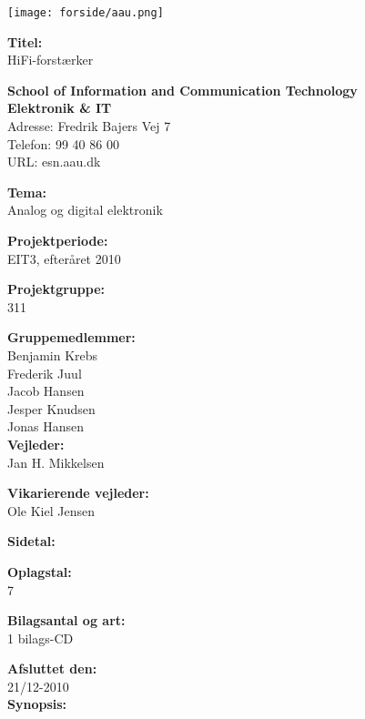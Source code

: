\begin{multicols}{2}
\texttt{[image: forside/aau.png]}

\small{\textbf{Titel:\\}
HiFi-forstærker}

\scriptsize{\textbf{School of Information and Communication Technology\\ Elektronik \& IT\\}
Adresse: Fredrik Bajers Vej 7\\
Telefon: 99 40 86 00\\
URL: esn.aau.dk \\}
\end{multicols}
\begin{multicols}{2}

\small{
\textbf{Tema:\\}
Analog og digital elektronik

\textbf{Projektperiode:\\}
EIT3, efteråret 2010

\textbf{Projektgruppe:\\}
311

\textbf{Gruppemedlemmer:\\}
Benjamin Krebs\\
Frederik Juul\\
Jacob Hansen\\
Jesper Knudsen\\
Jonas Hansen\\

\textbf{Vejleder:\\}
Jan H. Mikkelsen

\textbf{Vikarierende vejleder:\\}
Ole Kiel Jensen

\textbf{Sidetal:\\}
\pageref{LastPage}

\textbf{Oplagstal:\\}
7

\textbf{Bilagsantal og art:\\}
1 bilags-CD

\textbf{Afsluttet den:\\}
21/12-2010
\\
\textbf{Synopsis:}
}

\end{multicols}
